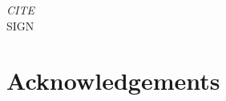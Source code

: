 \cleardoublepage{}
\blankpage{}

\begin{flushright}{
        \slshape
        CITE
    } \\
    \medskip
    SIGN
\end{flushright}

\begingroup
\let\clearpage\relax
\let\cleardoublepage\relax
\let\cleardoublepage\relax

\chapter*{Acknowledgements}

\vspace{0.75cm}

\noindent{\myLocation, \myTime}
\hfill \textit{\myName}

\endgroup
